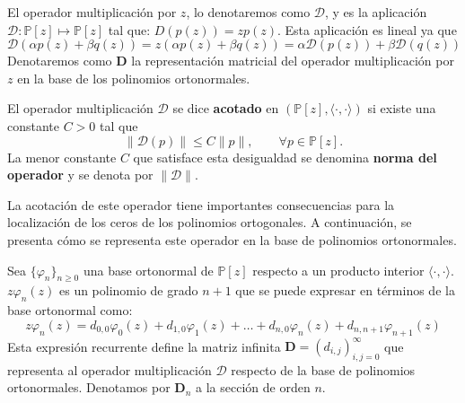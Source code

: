 \begin{definition}\label{def:d_application}
  El operador multiplicación por $z$, lo denotaremos como $\mathcal{D}$, y es la aplicación $\mathcal{D}:\mathbb{P}[z] \mapsto \mathbb{P}[z]$ tal que: $D(p(z))=zp(z)$.
  Esta aplicación es lineal ya que
  $$\mathcal{D}(\alpha p(z) + \beta q(z))=z(\alpha p(z) + \beta q(z))=\alpha \mathcal{D}(p(z)) + \beta \mathcal{D}(q(z))$$
  \noindent Denotaremos como $\mathbf{D}$ la representación matricial del operador multiplicación por $z$ en la base de los polinomios ortonormales.
\end{definition}

\begin{definition}\label{def:bounded_operator}
  El operador multiplicación $\mathcal{D}$ se dice \textbf{acotado} en $(\mathbb{P}[z], \langle \cdot, \cdot \rangle)$ si existe una constante $C > 0$ tal que
  \[
    \|\mathcal{D}(p)\| \leq C \|p\|, \qquad \forall p \in \mathbb{P}[z].
  \]
  La menor constante $C$ que satisface esta desigualdad se denomina \textbf{norma del operador} y se denota por $\|\mathcal{D}\|$.
\end{definition}

La acotación de este operador tiene importantes consecuencias para la localización de los ceros de los polinomios ortogonales. A continuación, se presenta cómo se representa este operador en la base de polinomios ortonormales.

\begin{definition}\label{def:d_representation}
  Sea \(\{\varphi_n\}_{n\ge0}\) una base ortonormal de \(\mathbb{P}[z]\) respecto a un
  producto interior \(\langle\!\cdot,\cdot\!\rangle\).
  $z\varphi_n(z)$ es un polinomio de grado $n+1$ que se puede expresar en términos de la base ortonormal como:
  $$
    z\varphi_n(z)= d_{0,0}\varphi_0(z)+d_{1,0}\varphi_1(z)+\dots+d_{n,0}\varphi_n(z)+d_{n,n+1}\varphi_{n+1}(z)
  $$
  \noindent Esta expresión recurrente define la matriz infinita $\mathbf{D}=(d_{i,j})_{i,j=0}^{\infty}$ que representa al operador multiplicación $\mathcal{D}$ respecto de la base de polinomios ortonormales. Denotamos por $\mathbf{D}_n$ a la sección de orden $n$.
\end{definition}

